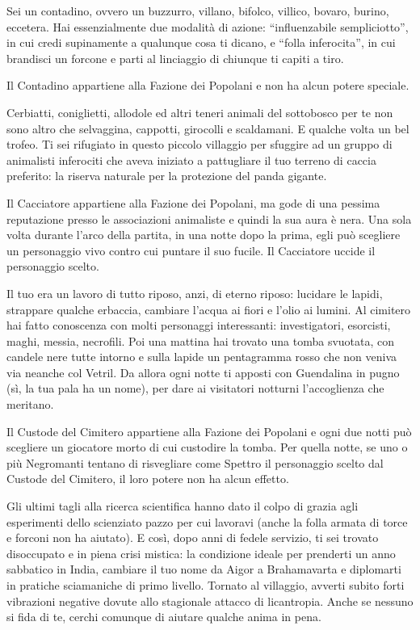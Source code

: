 {%
Sei un contadino, ovvero un buzzurro, villano, bifolco, villico, bovaro, burino, eccetera. Hai essenzialmente due modalità di azione: ``influenzabile sempliciotto'', in cui credi supinamente a qualunque cosa ti dicano, e ``folla inferocita'', in cui brandisci un forcone e parti al linciaggio di
chiunque ti capiti a tiro.

Il Contadino appartiene alla Fazione dei Popolani e non ha alcun potere speciale.
{%


{%
Cerbiatti, coniglietti, allodole ed altri teneri animali del sottobosco per te non sono altro che selvaggina, cappotti, girocolli e scaldamani. E qualche volta un bel trofeo. Ti sei rifugiato in questo piccolo villaggio per sfuggire ad un gruppo di animalisti inferociti che aveva iniziato a pattugliare il tuo terreno di caccia preferito: la riserva naturale per la protezione del panda gigante.

Il Cacciatore appartiene alla Fazione dei Popolani, ma gode di una pessima reputazione presso le associazioni animaliste e quindi la sua aura è nera. Una sola volta durante l'arco della partita, in una notte dopo la prima, egli può scegliere un personaggio vivo contro cui puntare il suo fucile. Il Cacciatore uccide il personaggio scelto.
{%


{%
Il tuo era un lavoro di tutto riposo, anzi, di eterno riposo: lucidare le lapidi, strappare qualche erbaccia, cambiare l'acqua ai fiori e l'olio ai lumini. Al cimitero hai fatto conoscenza con molti personaggi interessanti: investigatori, esorcisti, maghi, messia, necrofili. Poi una mattina hai trovato una tomba svuotata, con candele nere tutte intorno e sulla lapide un pentagramma rosso che non veniva via neanche col Vetril. Da allora ogni notte ti apposti con Guendalina in pugno (sì, la tua pala ha un nome), per dare ai visitatori notturni l'accoglienza che meritano.

Il Custode del Cimitero appartiene alla Fazione dei Popolani e ogni due notti può scegliere un giocatore morto di cui custodire la tomba. Per quella notte, se uno o più Negromanti tentano di risvegliare come Spettro il personaggio scelto dal Custode del Cimitero, il loro potere non ha alcun effetto.
{%


{%
Gli ultimi tagli alla ricerca scientifica hanno dato il colpo di grazia agli esperimenti dello scienziato pazzo per cui lavoravi (anche la folla armata di torce e forconi non ha aiutato). E così, dopo anni di fedele servizio, ti sei trovato disoccupato e in piena crisi mistica: la condizione ideale per prenderti un anno sabbatico in India, cambiare il tuo nome da Aigor a Brahamavarta e diplomarti in pratiche sciamaniche di primo livello. Tornato al villaggio, avverti subito forti vibrazioni negative dovute allo stagionale attacco di licantropia. Anche se nessuno si fida di te, cerchi comunque di aiutare qualche anima in pena.

}}}}}}}
